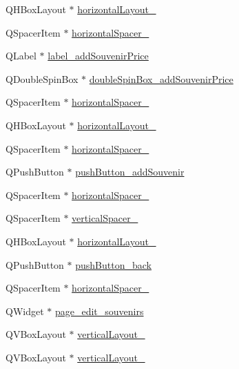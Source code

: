 \begin{DoxyCompactItemize}
\item 
Q\+H\+Box\+Layout $\ast$ \hyperlink{class_ui___main_window_afb4ab27a4cd626c64c34ab3651fa8413}{horizontal\+Layout\+\_}
\item 
Q\+Spacer\+Item $\ast$ \hyperlink{class_ui___main_window_adec5dc8b4a4c961d2ccb1273a6123c23}{horizontal\+Spacer\+\_}
\item 
Q\+Label $\ast$ \hyperlink{class_ui___main_window_a1819a3ad8689fe3d1057b696d6e91f52}{label\+\_\+add\+Souvenir\+Price}
\item 
Q\+Double\+Spin\+Box $\ast$ \hyperlink{class_ui___main_window_a2ab9412342e46ec3b60f16cd555de96a}{double\+Spin\+Box\+\_\+add\+Souvenir\+Price}
\item 
Q\+Spacer\+Item $\ast$ \hyperlink{class_ui___main_window_afdf4885db8752533956c8afea309627f}{horizontal\+Spacer\+\_}
\item 
Q\+H\+Box\+Layout $\ast$ \hyperlink{class_ui___main_window_af6d4b60faf9c3f9e4dabfb84f8234dc8}{horizontal\+Layout\+\_}
\item 
Q\+Spacer\+Item $\ast$ \hyperlink{class_ui___main_window_a460e714d8e1da7e96013b39c7a3ff609}{horizontal\+Spacer\+\_}
\item 
Q\+Push\+Button $\ast$ \hyperlink{class_ui___main_window_ad855d1d93c787b4b579f8572428ec8da}{push\+Button\+\_\+add\+Souvenir}
\item 
Q\+Spacer\+Item $\ast$ \hyperlink{class_ui___main_window_a92d6e301f65fad9005d1e0aef6e99e92}{horizontal\+Spacer\+\_}
\item 
Q\+Spacer\+Item $\ast$ \hyperlink{class_ui___main_window_a3e2778738105e03fbc1eea0298ece4ec}{vertical\+Spacer\+\_}
\item 
Q\+H\+Box\+Layout $\ast$ \hyperlink{class_ui___main_window_a17fe36cd2761bd56008536f9da5a4dc0}{horizontal\+Layout\+\_}
\item 
Q\+Push\+Button $\ast$ \hyperlink{class_ui___main_window_a111f7e700db9586e4cd1448036c2513e}{push\+Button\+\_\+back}
\item 
Q\+Spacer\+Item $\ast$ \hyperlink{class_ui___main_window_a437385432967a07681cd88b78cbe4f24}{horizontal\+Spacer\+\_}
\item 
Q\+Widget $\ast$ \hyperlink{class_ui___main_window_a013f37ac57dad716567134156940e63b}{page\+\_\+edit\+\_\+souvenirs}
\item 
Q\+V\+Box\+Layout $\ast$ \hyperlink{class_ui___main_window_ae0fcc85c6af290d1ba9d090c6856b217}{vertical\+Layout\+\_}
\item 
Q\+V\+Box\+Layout $\ast$ \hyperlink{class_ui___main_window_a9e0b3adf005fbcdb0364e0bba347fef8}{vertical\+Layout\+\_}

\end{DoxyCompactItemize}
